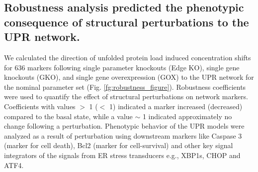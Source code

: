 \documentclass[fleqn,10pt]{wlscirep}
\begin{document}
\iffalse
This was most evident upon ATF4 feedback KO. We distinctly saw increase in sensitivity of feedback components associated with XBP1s and ATF6 (supplementary materials Fig. S\ref{fg:Sens_S3}). Upon ATF6 and XBP1s feedback KO, there wasn't much change in terms of sensitivity of the system. This further attests the key regulatory effect of ATF4 in mediating the positive BiP feedback which is an essential component of the adaptation phase of UPR. Another interesting observation was that when we completely knockout all the feedback branches of BiP in the adaptation phase, the system overall becomes relatively more robust (supplementary materials Fig. S\ref{fg:Sens_S3}). We distinctly saw a major shift of sensitivity of BiP upon removal of positive feedback. 
\fi


 

\subsection*{Robustness analysis predicted the phenotypic consequence of structural perturbations to the UPR network.} We calculated the direction of unfolded protein load induced concentration shifts for 636 markers following single parameter knockouts (Edge KO), single gene knockouts (GKO), and single gene overexpression (GOX) to the UPR network for the nominal parameter set (Fig. \ref{fg:robustness_figure}). Robustness coefficients were used to quantify the effect of structural perturbations on network markers. Coefficients with values $>$ 1 ($<$ 1) indicated a marker increased (decreased) compared to the basal state, while a value $\sim$ 1 indicated approximately no change following a perturbation. Phenotypic behavior of the UPR models were analyzed as a result of perturbation using downstream markers like Caspase 3 (marker for cell death), Bcl2 (marker for cell-survival) and other key signal integrators of the signals from ER stress transducers e.g., XBP1s, CHOP and ATF4.
\end{document}
